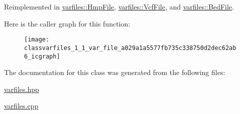 Reimplemented in \hyperlink{classvarfiles_1_1_hmp_file_a7f349e751b8a95cb1b4ded06eef85af9}{varfiles\+::\+Hmp\+File}, \hyperlink{classvarfiles_1_1_vcf_file_aaafc33a691977c8f60c9b129c920ee76}{varfiles\+::\+Vcf\+File}, and \hyperlink{classvarfiles_1_1_bed_file_a927cd985ae4d5897a052c2219391eae3}{varfiles\+::\+Bed\+File}.

Here is the caller graph for this function\+:\nopagebreak
\begin{figure}[H]
\begin{center}
\leavevmode
\texttt{[image: classvarfiles\_1\_1\_var\_file\_a029a1a5577fb735c338750d2dec62ab6\_icgraph]}
\end{center}
\end{figure}


The documentation for this class was generated from the following files\+:\begin{DoxyCompactItemize}
\item 
\hyperlink{varfiles_8hpp}{varfiles.\+hpp}\item 
\hyperlink{varfiles_8cpp}{varfiles.\+cpp}\end{DoxyCompactItemize}

